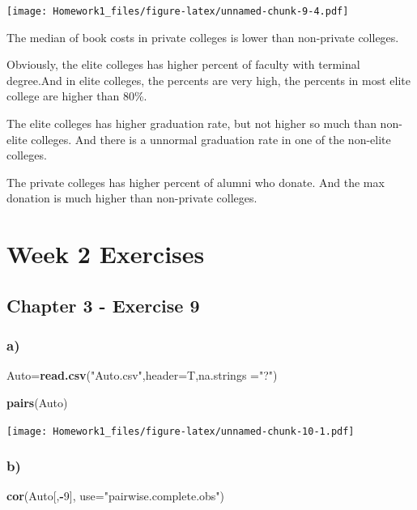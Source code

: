 \documentclass[]{article}
\newenvironment{Shaded}{\begin{snugshade}}{\end{snugshade}}
\newcommand{\KeywordTok}[1]{\textcolor[rgb]{0.13,0.29,0.53}{\textbf{#1}}}
\newcommand{\DataTypeTok}[1]{\textcolor[rgb]{0.13,0.29,0.53}{#1}}
\newcommand{\DecValTok}[1]{\textcolor[rgb]{0.00,0.00,0.81}{#1}}
\newcommand{\StringTok}[1]{\textcolor[rgb]{0.31,0.60,0.02}{#1}}
\newcommand{\OperatorTok}[1]{\textcolor[rgb]{0.81,0.36,0.00}{\textbf{#1}}}
\newcommand{\NormalTok}[1]{#1}
\begin{document}
\texttt{[image: Homework1\_files/figure-latex/unnamed-chunk-9-4.pdf]}

The median of book costs in private colleges is lower than non-private
colleges.

Obviously, the elite colleges has higher percent of faculty with
terminal degree.And in elite colleges, the percents are very high, the
percents in most elite college are higher than 80\%.

The elite colleges has higher graduation rate, but not higher so much
than non-elite colleges. And there is a unnormal graduation rate in one
of the non-elite colleges.

The private colleges has higher percent of alumni who donate. And the
max donation is much higher than non-private colleges.

\section{Week 2 Exercises}\label{week-2-exercises}

\subsection{Chapter 3 - Exercise 9}\label{chapter-3---exercise-9}

\subsubsection{a)}\label{a-2}

\begin{Shaded}
\begin{Highlighting}[]
\NormalTok{Auto=}\KeywordTok{read.csv}\NormalTok{(}\StringTok{"Auto.csv"}\NormalTok{,}\DataTypeTok{header=}\NormalTok{T,}\DataTypeTok{na.strings =}\StringTok{"?"}\NormalTok{)}

\KeywordTok{pairs}\NormalTok{(Auto)}
\end{Highlighting}
\end{Shaded}

\texttt{[image: Homework1\_files/figure-latex/unnamed-chunk-10-1.pdf]}

\subsubsection{b)}\label{b-3}

\begin{Shaded}
\begin{Highlighting}[]
\KeywordTok{cor}\NormalTok{(Auto[,}\OperatorTok{-}\DecValTok{9}\NormalTok{], }\DataTypeTok{use=}\StringTok{"pairwise.complete.obs"}\NormalTok{)}
\end{Highlighting}
\end{Shaded}
\end{document}
